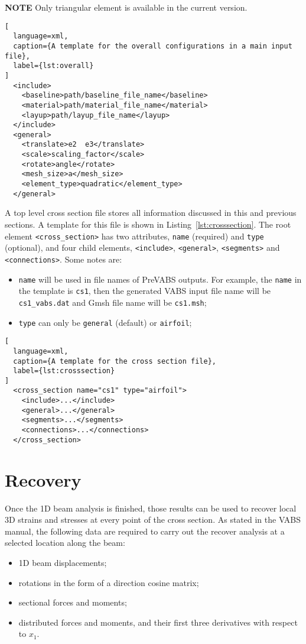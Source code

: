\documentclass{book}
\begin{document}
\textbf{NOTE} Only triangular element is available in the current version.

\begin{lstlisting}[
  language=xml,
  caption={A template for the overall configurations in a main input file},
  label={lst:overall}
]
  <include>
    <baseline>path/baseline_file_name</baseline>
    <material>path/material_file_name</material>
    <layup>path/layup_file_name</layup>
  </include>
  <general>
    <translate>e2  e3</translate>
    <scale>scaling_factor</scale>
    <rotate>angle</rotate>
    <mesh_size>a</mesh_size>
    <element_type>quadratic</element_type>
  </general>
\end{lstlisting}

A top level cross section file stores all information discussed in this 
and previous sections. A template for this file is shown in Listing~\ref{lst:crosssection}. 
The root element \lstinline{<cross_section>} has two attributes, 
\lstinline{name} (required) and \lstinline{type} (optional), and four 
child elements, \lstinline{<include>}, \lstinline{<general>}, 
\lstinline{<segments>} and \lstinline{<connections>}. Some notes are:
\begin{itemize}
  \item \lstinline{name} will be used in file names of PreVABS outputs. 
    For example, the \lstinline{name} in the template is \lstinline{cs1}, 
    then the generated VABS input file name will be \lstinline{cs1_vabs.dat} 
    and Gmsh file name will be \lstinline{cs1.msh};
  \item \lstinline{type} can only be \lstinline{general} (default) or 
    \lstinline{airfoil};
\end{itemize}

\begin{lstlisting}[
  language=xml,
  caption={A template for the cross section file},
  label={lst:crosssection}
]
  <cross_section name="cs1" type="airfoil">
    <include>...</include>
    <general>...</general>
    <segments>...</segments>
    <connections>...</connections>
  </cross_section>
\end{lstlisting}



\section{Recovery}
\label{sec:recover}

Once the 1D beam analysis is finished, those results can be used to 
recover local 3D strains and stresses at every point of the cross section. 
As stated in the VABS manual, the following data are required to carry 
out the recover analysis at a selected location along the beam:
\begin{itemize}
  \item 1D beam displacements;
  \item rotations in the form of a direction cosine matrix;
  \item sectional forces and moments;
  \item distributed forces and moments, and their first three derivatives 
    with respect to $x_1$.
\end{itemize}
\end{document}
